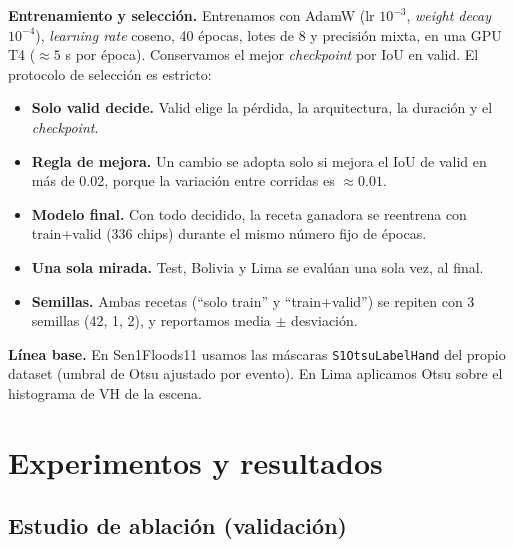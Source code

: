 \documentclass{article}
\begin{document}
\textbf{Entrenamiento y selección.} Entrenamos con AdamW (lr $10^{-3}$, \emph{weight decay} $10^{-4}$), \emph{learning rate} coseno, 40 épocas, lotes de 8 y precisión mixta, en una GPU T4 ($\approx 5$ s por época). Conservamos el mejor \emph{checkpoint} por IoU en valid. El protocolo de selección es estricto:
\begin{itemize}
  \item \textbf{Solo valid decide.} Valid elige la pérdida, la arquitectura, la duración y el \emph{checkpoint}.
  \item \textbf{Regla de mejora.} Un cambio se adopta solo si mejora el IoU de valid en más de 0.02, porque la variación entre corridas es $\approx 0.01$.
  \item \textbf{Modelo final.} Con todo decidido, la receta ganadora se reentrena con train+valid (336 chips) durante el mismo número fijo de épocas.
  \item \textbf{Una sola mirada.} Test, Bolivia y Lima se evalúan una sola vez, al final.
  \item \textbf{Semillas.} Ambas recetas (``solo train'' y ``train+valid'') se repiten con 3 semillas (42, 1, 2), y reportamos media $\pm$ desviación.
\end{itemize}

\textbf{Línea base.} En Sen1Floods11 usamos las máscaras \texttt{S1OtsuLabelHand} del propio dataset (umbral de Otsu ajustado por evento). En Lima aplicamos Otsu sobre el histograma de VH de la escena.

\section{Experimentos y resultados}

\subsection{Estudio de ablación (validación)}
\end{document}
